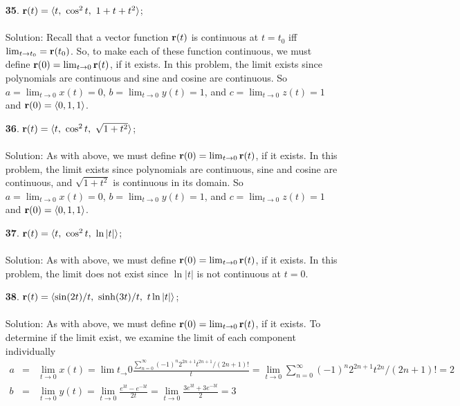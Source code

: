 \documentclass[12pt]{amsbook}
\newcommand{\la}{\langle}
\newcommand{\ra}{\rangle}
\begin{document}
\begin{enumerate}
  \item[{\small\bf 35}.] ${\bf r}(t)=\la t, \ \cos^2 t, \ 1+t+t^2\ra$; 
  \\
  \\
  {\sc Solution}: Recall that a vector function ${\bf r}(t)$ is continuous at $t=t_0$ iff $\lim_{t\rightarrow t_0}={\bf r}(t_0)$. So, to make each of these function continuous, we must define ${\bf r}(0)=\lim_{t \rightarrow 0}{\bf r}(t)$, if it exists. In this problem, the limit exists since polynomials are continuous and sine and cosine are continuous. So $a=\lim_{t\rightarrow 0}x(t)=0$, $b=\lim_{t\rightarrow 0}y(t)=1$, and $c=\lim_{t\rightarrow 0}z(t)=1$ and ${\bf r}(0)=\la 0,1,1 \ra$. 
  \\
  \item[{\small\bf 36}.] ${\bf r}(t)=\la t, \ \cos^2 t, \ \sqrt{1+t^2} \ra$; 
  \\
  \\
  {\sc Solution}: As with above, we must define ${\bf r}(0)=\lim_{t \rightarrow 0}{\bf r}(t)$, if it exists. In this problem, the limit exists since polynomials are continuous, sine and cosine are continuous, and $\sqrt{1+t^2}$ is continuous in its domain. So $a=\lim_{t\rightarrow 0}x(t)=0$, $b=\lim_{t\rightarrow 0}y(t)=1$, and $c=\lim_{t\rightarrow 0}z(t)=1$ and ${\bf r}(0)=\la 0,1,1 \ra$. 
  \\
  \item[{\small\bf 37}.] ${\bf r}(t)=\la t, \ \cos^2 t, \ \ln|t| \ra$; 
  \\
  \\
  {\sc Solution}: As with above, we must define ${\bf r}(0)=\lim_{t \rightarrow 0}{\bf r}(t)$, if it exists. In this problem, the limit does not exist since $\ln|t|$ is not continuous at $t=0$. 
  \\
  \item[{\small\bf 38}.] ${\bf r}(t)=\la \sin(2t)/t, \ \sinh(3t)/t, \ t\ln|t|\ra$; 
  \\
  \\
  {\sc Solution}: As with above, we must define ${\bf r}(0)=\lim_{t \rightarrow 0}{\bf r}(t)$, if it exists. To determine if the limit exist, we examine the limit of each component individually
  \begin{eqnarray*}
  a&=& \lim_{t\rightarrow 0}x(t)=\lim{t_\rightarrow 0}\frac{\sum_{n=0}^{\infty}(-1)^n2^{2n+1}t^{2n+1}/(2n+1)!}{t}=\lim_{t \rightarrow 0} \sum_{n=0}^{\infty}(-1)^n2^{2n+1}t^{2n}/(2n+1)!=2\\
  b&=&\lim_{t \rightarrow 0}y(t)=\lim_{t \rightarrow 0}\frac{e^{3t}-e^{-3t}}{2t}=\lim_{t \rightarrow 0}\frac{3e^{3t}+3e^{-3t}}{2}=3\\

\end{eqnarray*}
\end{enumerate}
\end{document}
